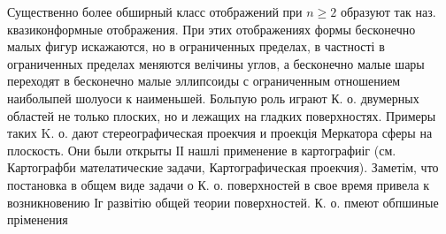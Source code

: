 \documentclass[10pt]{article}
\begin{document}
Существенно более обширный класс отображений при $n \geqslant 2$ образуют так наз. квазиконформные отображения. При этих отображениях формы бесконечно малых фигур искажаются, но в ограниченных пределах, в частності в ограниченных пределах меняются велічины углов, а бесконечно малые шары переходят в бесконечно малые эллипсоиды с ограниченным отношением наиболыпей шолуоси к наименьшей. Больпую роль играют К. $о$. двумерных областей не только плоских, но и лежащих на гладких поверхностях. Примеры таких $\mathrm{K}$. о. дают стереографическая проекчия и проекція Меркатора сферы на плоскость. Они были открыты ІІ нашлі применение в картографиіг (см. Картографби мателатические задачи, Картографическая проекчия). Заметім, что постановка в общем виде задачи о К. о. поверхностей в свое время привела к возникновению Іг развітію общей теории поверхностей. К. о. пмеют обпшиные пріменения
\end{document}
